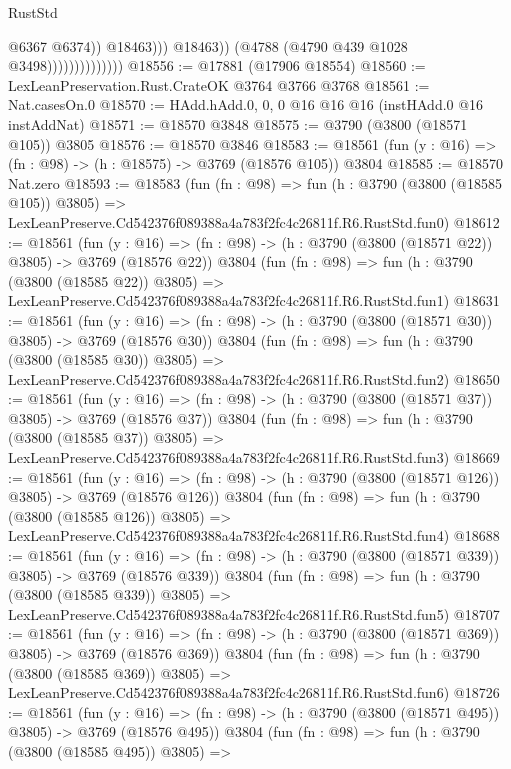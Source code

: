 \begin{lexlean}{RustStd}
\begin{coremodule}
                                          @6367
                                          @6374))
                                      @18463)))
                                @18463))
                            (@4788 (@4790 @439 @1028 @3498))))))))))))))
@18556 := @17881 (@17906 @18554)
@18560 := LexLeanPreservation.Rust.CrateOK @3764 @3766 @3768
@18561 := Nat.casesOn.{0}
@18570 := HAdd.hAdd.{0, 0, 0} @16 @16 @16 (instHAdd.{0} @16 instAddNat)
@18571 := @18570 @3848
@18575 := @3790 (@3800 (@18571 @105)) @3805
@18576 := @18570 @3846
@18583 := @18561 (fun (y : @16) => (fn : @98) -> (h : @18575) -> @3769 (@18576 @105)) @3804
@18585 := @18570 Nat.zero
@18593 := @18583
    (fun (fn : @98) =>
    fun (h : @3790 (@3800 (@18585 @105)) @3805) =>
    LexLeanPreserve.Cd542376f089388a4a783f2fc4c26811f.R6.RustStd.fun0)
@18612 := @18561
    (fun (y : @16) => (fn : @98) -> (h : @3790 (@3800 (@18571 @22)) @3805) -> @3769 (@18576 @22))
    @3804
    (fun (fn : @98) =>
    fun (h : @3790 (@3800 (@18585 @22)) @3805) =>
    LexLeanPreserve.Cd542376f089388a4a783f2fc4c26811f.R6.RustStd.fun1)
@18631 := @18561
    (fun (y : @16) => (fn : @98) -> (h : @3790 (@3800 (@18571 @30)) @3805) -> @3769 (@18576 @30))
    @3804
    (fun (fn : @98) =>
    fun (h : @3790 (@3800 (@18585 @30)) @3805) =>
    LexLeanPreserve.Cd542376f089388a4a783f2fc4c26811f.R6.RustStd.fun2)
@18650 := @18561
    (fun (y : @16) => (fn : @98) -> (h : @3790 (@3800 (@18571 @37)) @3805) -> @3769 (@18576 @37))
    @3804
    (fun (fn : @98) =>
    fun (h : @3790 (@3800 (@18585 @37)) @3805) =>
    LexLeanPreserve.Cd542376f089388a4a783f2fc4c26811f.R6.RustStd.fun3)
@18669 := @18561
    (fun (y : @16) => (fn : @98) -> (h : @3790 (@3800 (@18571 @126)) @3805) -> @3769 (@18576 @126))
    @3804
    (fun (fn : @98) =>
    fun (h : @3790 (@3800 (@18585 @126)) @3805) =>
    LexLeanPreserve.Cd542376f089388a4a783f2fc4c26811f.R6.RustStd.fun4)
@18688 := @18561
    (fun (y : @16) => (fn : @98) -> (h : @3790 (@3800 (@18571 @339)) @3805) -> @3769 (@18576 @339))
    @3804
    (fun (fn : @98) =>
    fun (h : @3790 (@3800 (@18585 @339)) @3805) =>
    LexLeanPreserve.Cd542376f089388a4a783f2fc4c26811f.R6.RustStd.fun5)
@18707 := @18561
    (fun (y : @16) => (fn : @98) -> (h : @3790 (@3800 (@18571 @369)) @3805) -> @3769 (@18576 @369))
    @3804
    (fun (fn : @98) =>
    fun (h : @3790 (@3800 (@18585 @369)) @3805) =>
    LexLeanPreserve.Cd542376f089388a4a783f2fc4c26811f.R6.RustStd.fun6)
@18726 := @18561
    (fun (y : @16) => (fn : @98) -> (h : @3790 (@3800 (@18571 @495)) @3805) -> @3769 (@18576 @495))
    @3804
    (fun (fn : @98) =>
    fun (h : @3790 (@3800 (@18585 @495)) @3805) =>

\end{coremodule}
\end{lexlean}
